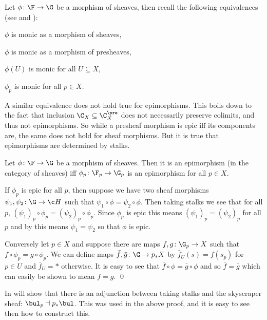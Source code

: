 Let $\phi\colon\F\to\G$ be a morphism of sheaves, then recall the following equivalences (see  and
):
\benum
    \item $\phi$ is monic as a morphism of sheaves,
    \item $\phi$ is monic as a morphism of presheaves,
    \item $\phi(U)$ is monic for all $U\subseteq X$,
    \item $\phi_p$ is monic for all $p\in X$.
\eenum

A similar equivalence does not hold true for epimorphisms.
This boils down to the fact that inclusion $\C_X\subseteq\C_X^\pre$ does not necessarily preserve colimits, and thus not epimorphisms.
So while a presheaf morphism is epic iff its components are, the same does not hold for sheaf morphisms.
But it is true that epimorphisms are determined by stalks.

\bprop[name={epionstalks}]

    Let $\phi\colon\F\to\G$ be a morphism of sheaves.
    Then it is an epimorphism (in the category of sheaves) iff $\phi_p\colon\F_p\to\G_p$ is an epimorphism for all $p\in X$.

\eprop

\bproof

    If $\phi_p$ is epic for all $p$, then suppose we have two sheaf morphisms $\psi_1,\psi_2\colon\G\to\c H$ such that
    $\psi_1\circ\phi=\psi_2\circ\phi$.
    Then taking stalks we see that for all $p$, $(\psi_1)_p\circ\phi_p=(\psi_2)_p\circ\phi_p$.
    Since $\phi_p$ is epic this means $(\psi_1)_p=(\psi_2)_p$ for all $p$ and by  this means
    $\psi_1=\psi_2$ so that $\phi$ is epic.

    Conversely let $p\in X$ and suppose there are maps $f,g\colon\G_p\to X$ such that $f\circ\phi_p=g\circ\phi_p$.
    We can define maps $\bar f,\bar g\colon\G\to p_*X$ by $\bar f_U(s)=f(s_p)$ for $p\in U$ and $\bar f_U=*$ otherwise.
    It is easy to see that $\bar f\circ\phi=\bar g\circ\phi$ and so $\bar f=\bar g$ which can easily be shown to mean $f=g$.
    \qed

\eproof

\bnote

    In  will show that there is an adjunction between taking stalks and the skyscraper
    sheaf: $\bul_p\dashv p_*\bul$.
    This was used in the above proof, and it is easy to see then how to construct this.


